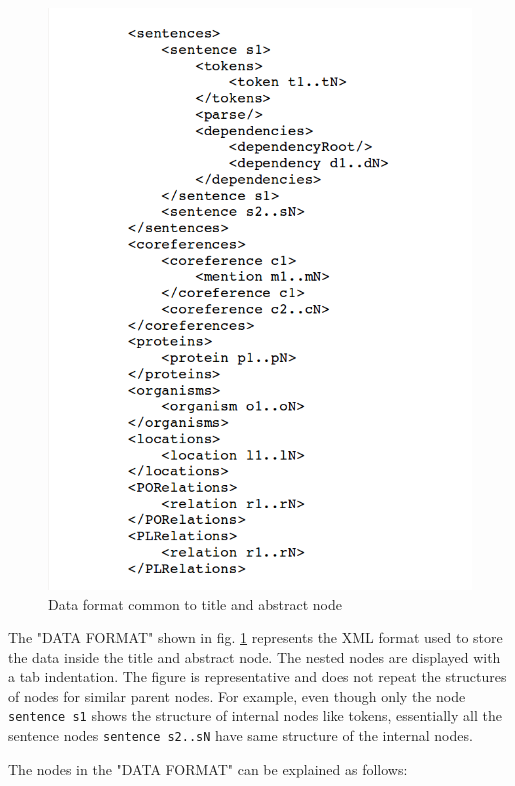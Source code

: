 \begin{enumerate}
\begin{figure}
\centering
\includegraphics[scale=0.4]{figures/XMLSchema2.png}
\caption{Data format common to title and abstract node}\label{fig:XMLSchema2}
\end{figure}

The "DATA FORMAT" shown in fig. \ref{fig:XMLSchema2} represents the XML format used to store the data inside the title and abstract node. The nested nodes are displayed with a tab indentation. The figure is representative and does not repeat the structures of nodes for similar parent nodes. For example, even though only the node \texttt{sentence s1} shows the structure of internal nodes like tokens, essentially all the sentence nodes \texttt{sentence s2..sN} have same structure of the internal nodes.

The nodes in the "DATA FORMAT" can be explained as follows:


\end{enumerate}
